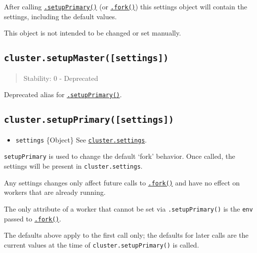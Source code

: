 After calling
\hyperref[clustersetupprimarysettings]{\texttt{.setupPrimary()}} (or
\hyperref[clusterforkenv]{\texttt{.fork()}}) this settings object will
contain the settings, including the default values.

This object is not intended to be changed or set manually.

\subsection{\texorpdfstring{\texttt{cluster.setupMaster({[}settings{]})}}{cluster.setupMaster({[}settings{]})}}\label{cluster.setupmastersettings}

\begin{quote}
Stability: 0 - Deprecated
\end{quote}

Deprecated alias for
\hyperref[clustersetupprimarysettings]{\texttt{.setupPrimary()}}.

\subsection{\texorpdfstring{\texttt{cluster.setupPrimary({[}settings{]})}}{cluster.setupPrimary({[}settings{]})}}\label{cluster.setupprimarysettings}

\begin{itemize}
\tightlist
\item
  \texttt{settings} \{Object\} See
  \hyperref[clustersettings]{\texttt{cluster.settings}}.
\end{itemize}

\texttt{setupPrimary} is used to change the default `fork' behavior.
Once called, the settings will be present in \texttt{cluster.settings}.

Any settings changes only affect future calls to
\hyperref[clusterforkenv]{\texttt{.fork()}} and have no effect on
workers that are already running.

The only attribute of a worker that cannot be set via
\texttt{.setupPrimary()} is the \texttt{env} passed to
\hyperref[clusterforkenv]{\texttt{.fork()}}.

The defaults above apply to the first call only; the defaults for later
calls are the current values at the time of
\texttt{cluster.setupPrimary()} is called.

